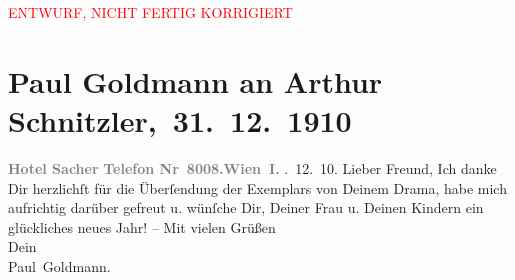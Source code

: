 
\begin{center}
            \textcolor{red}{ENTWURF, NICHT FERTIG KORRIGIERT}
                      \end{center}
            
         
         \renewcommand{\erwaehntePersonen}{Personen: Olga Schnitzler, Heinrich Schnitzler, Lili Schnitzler}
         \renewcommand{\erwaehnteOrte}{Orte: Hotel Sacher, Wien}
         \renewcommand{\erwaehnteWerke}{Werke: Das weite Land. Tragikomödie in fünf Akten}
               \section[ Paul Goldmann an Arthur Schnitzler, 31. 12. 1910]{ Paul Goldmann an Arthur Schnitzler, 31. 12. 1910}\nopagebreak{}\rehead{ }\begin{ledgroupsized}[t]{13cm}\normalsize\beginnumbering \toendnotes[C]{\smallbreak\pagebreak[2]} 
\toendnotes[C]{\smallbreak}\pstart
           \noindent{}\raggedleft{}{\pb}\textcolor{gray}{\textbf{Hotel Sacher}}\pend
           \pstart
           \noindent{}\textcolor{gray}{\textbf{Telefon Nr 8008.}}\hfill \textcolor{gray}{\textbf{Wien I.}}\pend
           . 12. 10.\pend
           \pstart\center{}Lieber Freund,\pend\pstart
           Ich danke Dir herzlichſt für die Überſendung der Exemplars von Deinem Drama, habe mich aufrichtig darüber gefreut
               u. wünſche Dir, Deiner Frau
               u. Deinen Kindern
               ein glückliches neues Jahr! – Mit vielen Grüßen {\\}Dein {\\}\spacefill\mbox{Paul Goldmann.}\pend
           
         
         \endnumbering{}\end{ledgroupsized}\begin{anhang}\end{anhang}\newcommand{\dateiname}{L03473}\newcommand{\titel}{Paul Goldmann an Arthur Schnitzler, 31. 12. 1910}\newcommand{\editorInnen}{Martin Anton Müller und Laura Untner}
      